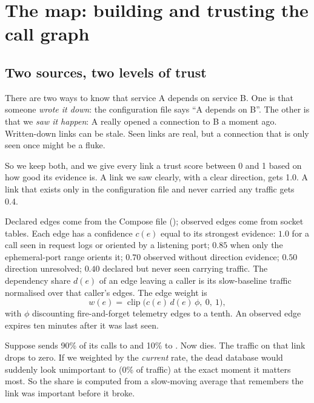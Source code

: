 \chapter{The map: building and trusting the call graph}
\label{ch:graph}

\section{Two sources, two levels of trust}
\begin{simplebox}
There are two ways to know that service A depends on service B. One is that someone \emph{wrote it down}: the configuration file says ``A depends on B''. The other is that we \emph{saw it happen}: A really opened a connection to B a moment ago. Written-down links can be stale. Seen links are real, but a connection that is only seen once might be a fluke.

So we keep both, and we give every link a trust score between 0 and 1 based on how good its evidence is. A link we saw clearly, with a clear direction, gets 1.0. A link that exists only in the configuration file and never carried any traffic gets 0.4.
\end{simplebox}

\begin{techbox}
Declared edges come from the Compose file (); observed edges come from socket tables. Each edge has a confidence $c(e)$ equal to its strongest evidence: $1.0$ for a call seen in request logs or oriented by a listening port; $0.85$ when only the ephemeral-port range orients it; $0.70$ observed without direction evidence; $0.50$ direction unresolved; $0.40$ declared but never seen carrying traffic. The dependency share $d(e)$ of an edge leaving a caller is its slow-baseline traffic normalised over that caller's edges. The edge weight is
\[
w(e)=\operatorname{clip}\bigl(c(e)\,d(e)\,\phi,\ 0,\ 1\bigr),
\]
with $\phi$ discounting fire-and-forget telemetry edges to a tenth. An observed edge expires ten minutes after it was last seen.
\end{techbox}

\begin{examplebox}
Suppose  sends 90\% of its calls to  and 10\% to . Now  dies. The traffic on that link drops to zero. If we weighted by the \emph{current} rate, the dead database would suddenly look unimportant to  (0\% of traffic) at the exact moment it matters most. So the share is computed from a slow-moving average that remembers the link was important before it broke.
\end{examplebox}

